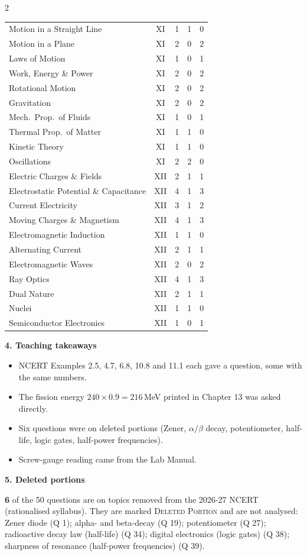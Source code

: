 \begin{multicols}{2}
{\begin{tabular}{@{}p{4.7cm}c@{\,}r@{\,}r@{\,}r@{}}
Motion in a Straight Line & XI & 1 & 1 & 0\\
Motion in a Plane & XI & 2 & 0 & 2\\
Laws of Motion & XI & 1 & 0 & 1\\
Work, Energy \& Power & XI & 2 & 0 & 2\\
Rotational Motion & XI & 2 & 0 & 2\\
Gravitation & XI & 2 & 0 & 2\\
Mech.\ Prop.\ of Fluids & XI & 1 & 0 & 1\\
Thermal Prop.\ of Matter & XI & 1 & 1 & 0\\
Kinetic Theory & XI & 1 & 1 & 0\\
Oscillations & XI & 2 & 2 & 0\\
Electric Charges \& Fields & XII & 2 & 1 & 1\\
Electrostatic Potential \& Capacitance & XII & 4 & 1 & 3\\
Current Electricity & XII & 3 & 1 & 2\\
Moving Charges \& Magnetism & XII & 4 & 1 & 3\\
Electromagnetic Induction & XII & 1 & 1 & 0\\
Alternating Current & XII & 2 & 1 & 1\\
Electromagnetic Waves & XII & 2 & 0 & 2\\
Ray Optics & XII & 4 & 1 & 3\\
Dual Nature & XII & 2 & 1 & 1\\
Nuclei & XII & 1 & 1 & 0\\
Semiconductor Electronics & XII & 1 & 0 & 1\\
\bottomrule\end{tabular}}\par\medskip
\textbf{\color{crimson}4. Teaching takeaways}\par\smallskip
{\footnotesize\begin{itemize}[leftmargin=1em,nosep]
\item NCERT Examples 2.5, 4.7, 6.8, 10.8 and 11.1 each gave a question, some with the same numbers.
\item The fission energy $240\times0.9=216$\,MeV printed in Chapter 13 was asked directly.
\item Six questions were on deleted portions (Zener, $\alpha/\beta$ decay, potentiometer, half-life, logic gates, half-power frequencies).
\item Screw-gauge reading came from the Lab Manual.
\end{itemize}}\par\medskip
\textbf{\color{crimson}5. Deleted portions}\par\smallskip
\textbf{6} of the 50 questions are on topics removed from the 2026-27 NCERT (rationalised syllabus). They are marked \textsc{Deleted Portion} and are not analysed: Zener diode (Q 1); alpha- and beta-decay (Q 19); potentiometer (Q 27); radioactive decay law (half-life) (Q 34); digital electronics (logic gates) (Q 38); sharpness of resonance (half-power frequencies) (Q 39).\par
\end{multicols}


